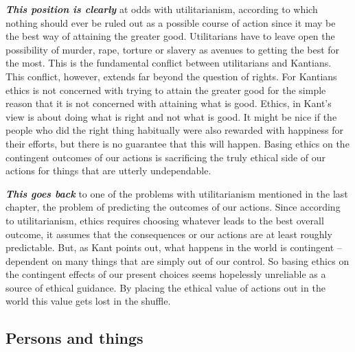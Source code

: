 \documentclass[
  12pt, openany]{book}
\begin{document}
\textbf{\emph{This position is clearly}} at odds with utilitarianism, according to which nothing should ever be ruled out as a possible course of action since it may be the best way of attaining the greater good. Utilitarians have to leave open the possibility of murder, rape, torture or slavery as avenues to getting the best for the most. This is the fundamental conflict between utilitarians and Kantians. This conflict, however, extends far beyond the question of rights. For Kantians ethics is not concerned with trying to attain the greater good for the simple reason that it is not concerned with attaining what is good. Ethics, in Kant's view is about doing what is right and not what is good. It might be nice if the people who did the right thing habitually were also rewarded with happiness for their efforts, but there is no guarantee that this will happen. Basing ethics on the contingent outcomes of our actions is sacrificing the truly ethical side of our actions for things that are utterly undependable.

\textbf{\emph{This goes back}} to one of the problems with utilitarianism mentioned in the last chapter, the problem of predicting the outcomes of our actions. Since according to utilitarianism, ethics requires choosing whatever leads to the best overall outcome, it assumes that the consequences or our actions are at least roughly predictable. But, as Kant points out, what happens in the world is contingent -- dependent on many things that are simply out of our control. So basing ethics on the contingent effects of our present choices seems hopelessly unreliable as a source of ethical guidance. By placing the ethical value of actions out in the world this value gets lost in the shuffle.

\hypertarget{persons-and-things}{%
\subsection*{Persons and things}\label{persons-and-things}}
\end{document}
